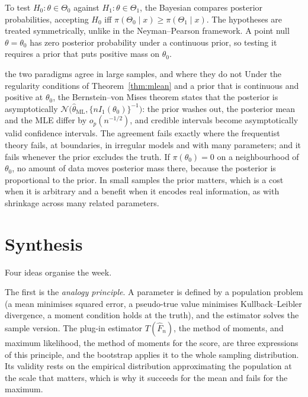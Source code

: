 \documentclass[11pt,a4paper]{article}
\newcommand{\N}{\mathcal{N}}
\newcommand{\op}{o_p}
\newcommand{\Fn}{\widehat F_n}
\newcommand{\thml}{\hat\theta_{\mathrm{ML}}}
\begin{document}
To test $H_0:\theta\in\Theta_0$ against $H_1:\theta\in\Theta_1$, the Bayesian compares posterior probabilities, accepting $H_0$ iff $\pi(\Theta_0\mid x)\ge\pi(\Theta_1\mid x)$. The hypotheses are treated symmetrically, unlike in the Neyman--Pearson framework. A point null $\theta=\theta_0$ has zero posterior probability under a continuous prior, so testing it requires a prior that puts positive mass on $\theta_0$.

\begin{whybox}{the two paradigms agree in large samples, and where they do not}
Under the regularity conditions of Theorem~\ref{thm:mlean} and a prior that is continuous and positive at $\theta_0$, the Bernstein--von Mises theorem states that the posterior is asymptotically $\N\big(\thml,\{nI_1(\theta_0)\}^{-1}\big)$: the prior washes out, the posterior mean and the MLE differ by $\op(n^{-1/2})$, and credible intervals become asymptotically valid confidence intervals. The agreement fails exactly where the frequentist theory fails, at boundaries, in irregular models and with many parameters; and it fails whenever the prior excludes the truth. If $\pi(\theta_0)=0$ on a neighbourhood of $\theta_0$, no amount of data moves posterior mass there, because the posterior is proportional to the prior. In small samples the prior matters, which is a cost when it is arbitrary and a benefit when it encodes real information, as with shrinkage across many related parameters.
\end{whybox}

\section*{Synthesis}

Four ideas organise the week.

The first is the \emph{analogy principle}. A parameter is defined by a population problem (a mean minimises squared error, a pseudo-true value minimises Kullback--Leibler divergence, a moment condition holds at the truth), and the estimator solves the sample version. The plug-in estimator $T(\Fn)$, the method of moments, and maximum likelihood, the method of moments for the score, are three expressions of this principle, and the bootstrap applies it to the whole sampling distribution. Its validity rests on the empirical distribution approximating the population at the scale that matters, which is why it succeeds for the mean and fails for the maximum.
\end{document}
